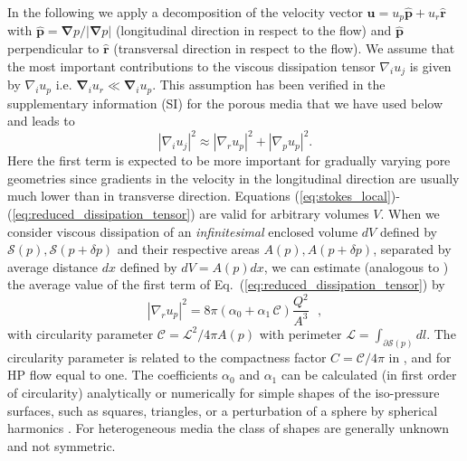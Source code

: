 \documentclass[draft]{agujournal2019}
\begin{document}
In the following we apply a decomposition of the velocity vector $\mathbf{u} = u_p \mathbf{\hat{p}} + u_r \mathbf{\hat{r}}$ with $\mathbf{\hat{p}} =\mathbf{ \nabla}p/|\mathbf{ \nabla}p|$ (longitudinal direction in respect to the flow) and $\hat{\mathbf{p}}$ perpendicular to $\hat{\mathbf{r}}$ (transversal direction in respect to the flow). We assume that the most important contributions to the viscous dissipation tensor $\nabla_i u_j$ is given by $\nabla_i u_p$ i.e. $\mathbf{\nabla}_i u_r \ll \mathbf{\nabla}_i u_p $. This assumption has been verified in the supplementary information (SI) for the porous media that we have used below and leads to 
\begin{equation}
\left|\nabla_i u_j\right|^2 \approx  \left|\nabla_r u_p\right|^2 + \left|\nabla_p u_p\right|^2 .\label{eq:reduced_dissipation_tensor}
\end{equation}
Here the first term is expected to be more important for gradually varying pore geometries since gradients in the velocity in the longitudinal direction are usually much lower than in transverse direction. Equations (\ref{eq:stokes_local})-(\ref{eq:reduced_dissipation_tensor}) are valid for arbitrary volumes $V$. When we consider viscous dissipation of an \textit{infinitesimal} enclosed volume $dV$ defined by $\mathcal{S}(p),\mathcal{S}(p+\delta p)$ and their respective areas $A(p), A(p+\delta p)$, separated by average distance $dx$ defined by $dV = A(p)dx$, we can estimate (analogous to ) the average value of the first term of Eq.~(\ref{eq:reduced_dissipation_tensor}) by
\begin{equation}
	\left|\nabla_r u_p\right|^2 =8\pi \left(\alpha_0+\alpha_1\,\mathcal{C}\right)\frac{ Q^2}{A^3}~~~ ,\label{eq:tau_1}
\end{equation}
with circularity parameter $\mathcal{C} = \mathcal{L}^2/4\pi A(p)$ with perimeter $\mathcal{L} = \int_{\partial \mathcal{S}(p)}dl$. The circularity parameter is related to the compactness factor $C = \mathcal{C}/4\pi$ in \cite{mortensen_reexamination_2005}, and for HP flow equal to one. The coefficients $\alpha_0$ and $\alpha_1$ can be calculated (in first order of circularity) analytically or numerically for simple shapes of the iso-pressure surfaces, such as squares, triangles, or a perturbation of a sphere by spherical harmonics \cite{mortensen_reexamination_2005}. For heterogeneous media the class of shapes are generally unknown and not symmetric. 
\end{document}
